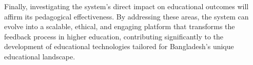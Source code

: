 \documentclass[conference]{IEEEtran}
\begin{document}
Finally, investigating the system's direct impact on educational outcomes will affirm its pedagogical effectiveness. By addressing these areas, the system can evolve into a scalable, ethical, and engaging platform that transforms the feedback process in higher education, contributing significantly to the development of educational technologies tailored for Bangladesh's unique educational landscape.




\end{document}
